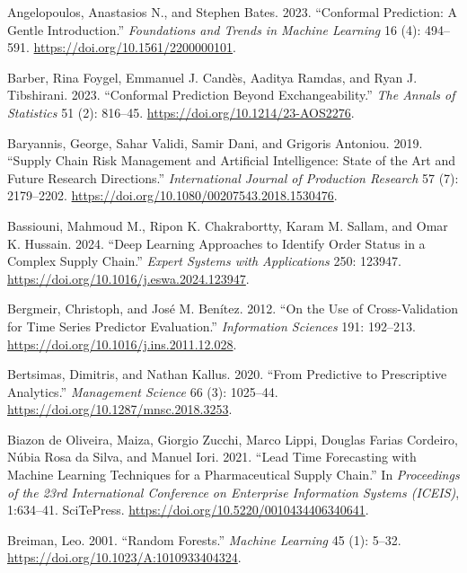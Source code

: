 \documentclass[
]{article}
\newlength{\cslhangindent}
\newenvironment{CSLReferences}[2] %
 {\begin{list}{}{%
  \setlength{\itemindent}{0pt}
  \setlength{\leftmargin}{0pt}
  \setlength{\parsep}{0pt}
  \ifodd #1
   \setlength{\leftmargin}{\cslhangindent}
   \setlength{\itemindent}{-1\cslhangindent}
  \fi
  \setlength{\itemsep}{#2\baselineskip}}}
 {\end{list}}
\begin{document}
\label{refs}
\begin{CSLReferences}{1}{0}
Angelopoulos, Anastasios N., and Stephen Bates. 2023. {``Conformal
Prediction: A Gentle Introduction.''} \emph{Foundations and Trends in
Machine Learning} 16 (4): 494--591.
\url{https://doi.org/10.1561/2200000101}.

Barber, Rina Foygel, Emmanuel J. Candès, Aaditya Ramdas, and Ryan J.
Tibshirani. 2023. {``Conformal Prediction Beyond Exchangeability.''}
\emph{The Annals of Statistics} 51 (2): 816--45.
\url{https://doi.org/10.1214/23-AOS2276}.

Baryannis, George, Sahar Validi, Samir Dani, and Grigoris Antoniou.
2019. {``Supply Chain Risk Management and Artificial Intelligence: State
of the Art and Future Research Directions.''} \emph{International
Journal of Production Research} 57 (7): 2179--2202.
\url{https://doi.org/10.1080/00207543.2018.1530476}.

Bassiouni, Mahmoud M., Ripon K. Chakrabortty, Karam M. Sallam, and Omar
K. Hussain. 2024. {``Deep Learning Approaches to Identify Order Status
in a Complex Supply Chain.''} \emph{Expert Systems with Applications}
250: 123947. \url{https://doi.org/10.1016/j.eswa.2024.123947}.

Bergmeir, Christoph, and José M. Benítez. 2012. {``On the Use of
Cross-Validation for Time Series Predictor Evaluation.''}
\emph{Information Sciences} 191: 192--213.
\url{https://doi.org/10.1016/j.ins.2011.12.028}.

Bertsimas, Dimitris, and Nathan Kallus. 2020. {``From Predictive to
Prescriptive Analytics.''} \emph{Management Science} 66 (3): 1025--44.
\url{https://doi.org/10.1287/mnsc.2018.3253}.

Biazon de Oliveira, Maiza, Giorgio Zucchi, Marco Lippi, Douglas Farias
Cordeiro, Núbia Rosa da Silva, and Manuel Iori. 2021. {``Lead Time
Forecasting with Machine Learning Techniques for a Pharmaceutical Supply
Chain.''} In \emph{Proceedings of the 23rd International Conference on
Enterprise Information Systems (ICEIS)}, 1:634--41. SciTePress.
\url{https://doi.org/10.5220/0010434406340641}.

Breiman, Leo. 2001. {``Random Forests.''} \emph{Machine Learning} 45
(1): 5--32. \url{https://doi.org/10.1023/A:1010933404324}.


\end{CSLReferences}
\end{document}
